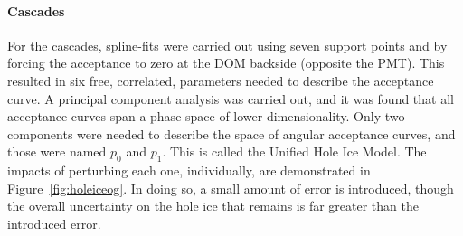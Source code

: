 \documentclass[main.tex]{subfiles}
\begin{document}
\paragraph{Cascades}

For the cascades, spline-fits were carried out using seven support points and by forcing the acceptance to zero at the DOM backside (opposite the PMT). 
This resulted in six free, correlated, parameters needed to describe the acceptance curve. 
A principal component analysis was carried out, and it was found that all acceptance curves span a phase space of lower dimensionality. 
Only two components were needed to describe the space of angular acceptance curves, and those were named $p_{0}$ and $p_{1}$.
This is called the Unified Hole Ice Model.
The impacts of perturbing each one, individually, are demonstrated in Figure~\ref{fig:holeiceog}. 
In doing so, a small amount of error is introduced, though the overall uncertainty on the hole ice that remains is far greater than the introduced error. 
\end{document}
